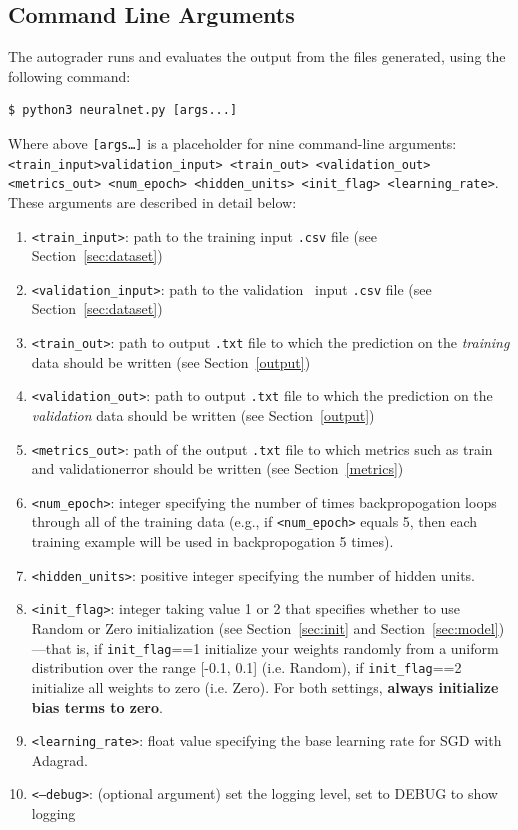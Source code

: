 \documentclass[11pt,addpoints,answers]{exam}
\begin{document}
\subsection{Command Line Arguments}
\label{sec:args}
The autograder runs and evaluates the output from the files generated, using the following command:

\begin{lstlisting}[language=Shell]
$ python3 neuralnet.py [args...]
\end{lstlisting}

Where above \texttt{[args\dots]} is a placeholder for nine command-line arguments: \texttt{<train\_input>}\newline \texttt{validation\_input> <train\_out> <validation\_out> <metrics\_out> <num\_epoch> \newline <hidden\_units>  <init\_flag> <learning\_rate>}. These arguments are described in detail below:
\begin{enumerate}
    \item \texttt{<train\_input>}: path to the training input \texttt{.csv} file (see Section~\ref{sec:dataset})
    \item \texttt{<validation\_input>}: path to the validation \ input \texttt{.csv} file (see Section~\ref{sec:dataset})
    \item \texttt{<train\_out>}: path to output \texttt{.txt} file to which the prediction on the \emph{training} data should be written (see Section~\ref{output})
    \item \texttt{<validation\_out>}: path to output \texttt{.txt} file to which the prediction on the \emph{validation} data should be written (see Section~\ref{output})
    \item \texttt{<metrics\_out>}: path of the output \texttt{.txt} file to which metrics such as train and validation\thinspace error should be written (see Section~\ref{metrics})
    \item \texttt{<num\_epoch>}: integer specifying the number of times backpropogation loops through all of the training data (e.g., if \texttt{<num\_epoch>} equals 5, then each training example will be used in backpropogation 5 times).
    \item \texttt{<hidden\_units>}: positive integer specifying the number of hidden units. 
    \item \texttt{<init\_flag>}: integer taking value 1 or 2 that specifies whether to use {\sc Random} or {\sc Zero} initialization (see Section~\ref{sec:init} and Section~\ref{sec:model})---that is, if \lstinline{init_flag}==1 initialize your weights randomly from a uniform distribution over the range [-0.1, 0.1] (i.e. {\sc Random}), if \lstinline{init_flag}==2 initialize all weights to zero (i.e. {\sc Zero}). For both settings, {\bf always initialize bias terms to zero}.
    \item \texttt{<learning\_rate>}: float value specifying the base learning rate for SGD with Adagrad.
     \item \texttt{<--debug>}: (optional argument) set the logging level, set to DEBUG to show logging
    
\end{enumerate}
\end{document}

